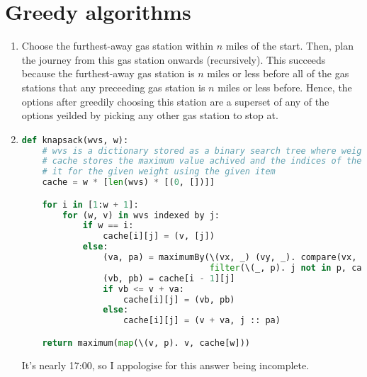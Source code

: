 \documentclass[11pt]{article}
\begin{document}
\section{Greedy algorithms}
\begin{enumerate}
\item Choose the furthest-away gas station within \(n\) miles of the start. Then, plan the journey from this gas station onwards (recursively). This succeeds because the furthest-away gas station is \(n\) miles or less before all of the gas stations that any preceeding gas station is \(n\) miles or less before. Hence, the options after greedily choosing this station are a superset of any of the options yeilded by picking any other gas station to stop at.
\item \begin{minipage}[t]{\linewidth}\begin{lstlisting}[language=python,basicstyle=\tiny]
def knapsack(wvs, w):
    # wvs is a dictionary stored as a binary search tree where weights are the keys.
    # cache stores the maximum value achived and the indices of the items used to achieve
    # it for the given weight using the given item
    cache = w * [len(wvs) * [(0, [])]]

    for i in [1:w + 1]:
        for (w, v) in wvs indexed by j:
            if w == i:
                cache[i][j] = (v, [j])
            else:
                (va, pa) = maximumBy(\(vx, _) (vy, _). compare(vx, vy),
                                     filter(\(_, p). j not in p, cache[i - w]))
                (vb, pb) = cache[i - 1][j]
                if vb <= v + va:
                    cache[i][j] = (vb, pb)
                else:
                    cache[i][j] = (v + va, j :: pa)

    return maximum(map(\(v, p). v, cache[w]))
\end{lstlisting}\end{minipage}
It's nearly 17:00, so I appologise for this answer being incomplete.
\end{enumerate}
\end{document}
